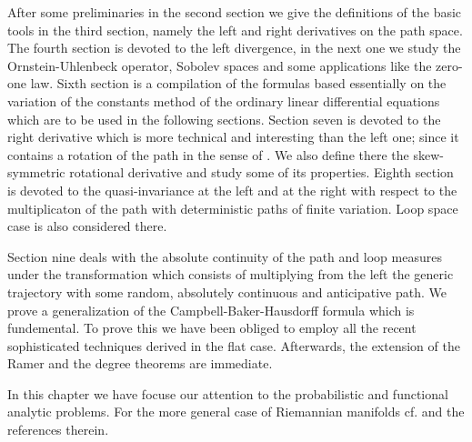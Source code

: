\documentclass[12pt,a4paper]{book}
\begin{document}
After some preliminaries in the second section we give the definitions of the
basic tools in the third section, namely the left and right derivatives on the
path space. The fourth section is devoted to the left divergence, in the next
one we study the Ornstein-Uhlenbeck operator, Sobolev spaces and some
applications like the zero-one law. Sixth section is a compilation of the
formulas based essentially on the variation of the constants method of the
ordinary linear differential equations which are to be used in the following
sections. Section seven is devoted to the right derivative which is more
technical and interesting than the left one;  since it contains a
rotation of the path in the sense
of \cite{UZ4}. We also define there the skew-symmetric rotational derivative
and study some of its properties.
 Eighth section is devoted to the quasi-invariance at the left and at the right
 with respect to the multiplicaton of the path with deterministic paths of
 finite variation. Loop space case is also considered there.

Section nine deals with the absolute continuity of the path and loop measures
under the transformation which consists of multiplying from the left
the generic trajectory
with some random, absolutely continuous and anticipative path. We prove a
generalization of the Campbell-Baker-Hausdorff formula which is
fundemental. To prove
this we have been obliged to employ all the recent sophisticated techniques
derived in the flat case. Afterwards, the extension of the Ramer and the degree
theorems are immediate.

In this chapter  we have focuse  our attention to the
probabilistic and functional analytic problems. For the more
general case of Riemannian manifolds cf. \cite{Mall-1} and the
references therein.
\end{document}
